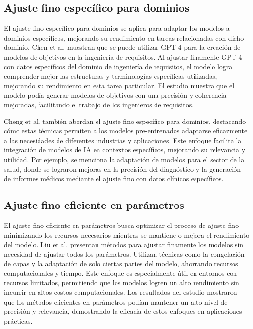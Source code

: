 \subsection{Ajuste fino específico para dominios}

El ajuste fino específico para dominios se aplica para adaptar los modelos a dominios específicos, mejorando su rendimiento en tareas relacionadas con dicho dominio. Chen et al. \cite{Chen2023} muestran que  se puede utilizar GPT-4 para la creación de modelos de objetivos en la ingeniería de requisitos. Al ajustar finamente GPT-4 con datos específicos del dominio de ingeniería de requisitos, el modelo logra comprender mejor las estructuras y terminologías específicas utilizadas, mejorando su rendimiento en esta tarea particular. El estudio muestra que el modelo podía generar modelos de objetivos con una precisión y coherencia mejoradas, facilitando el trabajo de los ingenieros de requisitos.

Cheng et al. \cite{Cheng2023} también abordan el ajuste fino específico para dominios, destacando cómo estas técnicas permiten a los modelos pre-entrenados adaptarse eficazmente a las necesidades de diferentes industrias y aplicaciones. Este enfoque facilita la integración de modelos de IA en contextos específicos, mejorando su relevancia y utilidad. Por ejemplo, se menciona la adaptación de modelos para el sector de la salud, donde se lograron mejoras en la precisión del diagnóstico y la generación de informes médicos mediante el ajuste fino con datos clínicos específicos.

\subsection{Ajuste fino eficiente en parámetros}

El ajuste fino eficiente en parámetros busca optimizar el proceso de ajuste fino minimizando los recursos necesarios mientras se mantiene o mejora el rendimiento del modelo. Liu et al. \cite{Liu2023} presentan métodos para ajustar finamente los modelos sin necesidad de ajustar todos los parámetros. Utilizan técnicas como la congelación de capas y la adaptación de solo ciertas partes del modelo, ahorrando recursos computacionales y tiempo. Este enfoque es especialmente útil en entornos con recursos limitados, permitiendo que los modelos logren un alto rendimiento sin incurrir en altos costos computacionales. Los resultados del estudio mostraron que los métodos eficientes en parámetros podían mantener un alto nivel de precisión y relevancia, demostrando la eficacia de estos enfoques en aplicaciones prácticas.

